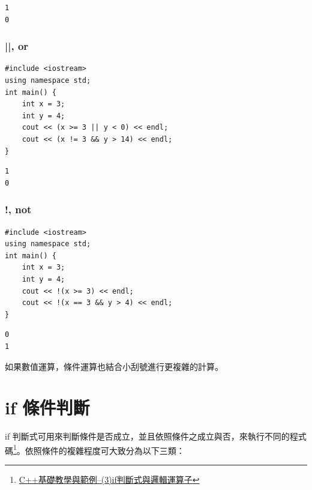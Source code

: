 \documentclass[12pt,a4paper]{article}
\begin{document}
\begin{verbatim}
1
0
\end{verbatim}

\subsubsection{||, or}
\label{sec:orgd99e69a}
\lstset{breaklines=true,language=cpp,label= ,caption= ,captionpos=b,firstnumber=1,numbers=left}
\begin{lstlisting}
#include <iostream>
using namespace std;
int main() {
    int x = 3;
    int y = 4;
    cout << (x >= 3 || y < 0) << endl;
    cout << (x != 3 && y > 14) << endl;
}
\end{lstlisting}

\begin{verbatim}
1
0
\end{verbatim}

\subsubsection{!, not}
\label{sec:orgaefce76}
\lstset{breaklines=true,language=cpp,label= ,caption= ,captionpos=b,firstnumber=1,numbers=left}
\begin{lstlisting}
#include <iostream>
using namespace std;
int main() {
    int x = 3;
    int y = 4;
    cout << !(x >= 3) << endl;
    cout << !(x == 3 && y > 4) << endl;
}
\end{lstlisting}

\begin{verbatim}
0
1
\end{verbatim}


如果數值運算，條件運算也結合小刮號進行更複雜的計算。

\section{if 條件判斷}
\label{cpp_ifelse}
if 判斷式可用來判斷條件是否成立，並且依照條件之成立與否，來執行不同的程式碼\footnote{\href{https://crmne0707.pixnet.net/blog/post/285395384-c\%2B\%2B\%E5\%9F\%BA\%E7\%A4\%8E\%E6\%95\%99\%E5\%AD\%B8\%E8\%88\%87\%E7\%AF\%84\%E4\%BE\%8B--https://crmne0707.pixnet.net/blog/post/285395384-c\%2B\%2B\%E5\%9F\%BA\%E7\%A4\%8E\%E6\%95\%99\%E5\%AD\%B8\%E8\%88\%87\%E7\%AF\%84\%E4\%BE\%8B--\%283\%29if\%E5\%88\%A4\%E6\%96\%B7\%E5\%BC\%8F\%E8\%88\%87\%E9\%82\%8F\%E8\%BC\%AF\%E9\%81\%8B\%E7\%AE\%97\%E5\%AD\%90}{C++基礎教學與範例--(3)if判斷式與邏輯運算子}}。依照條件的複雜程度可大致分為以下三類：
\end{document}
